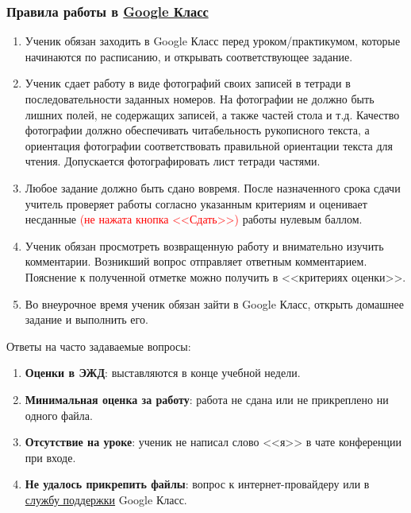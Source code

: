 \documentclass[algebra,a5paper]{pum}
\begin{document}
\subsubsection*{Правила работы в \href{https://classroom.google.com/}{Google Класс}}
\begin{enumerate}[nosep]
  \item Ученик обязан заходить в Google Класс перед уроком/практикумом, которые начинаются по расписанию, и открывать соответствующее задание.
  \item Ученик сдает работу в виде фотографий своих записей в тетради в последовательности заданных номеров. На фотографии не должно быть лишних полей, не содержащих записей, а также частей стола и т.д. Качество фотографии должно обеспечивать читабельность рукописного текста, а ориентация фотографии соответствовать правильной ориентации текста для чтения. Допускается фотографировать лист тетради частями.
  \item Любое задание должно быть сдано вовремя. После назначенного срока сдачи учитель проверяет работы согласно указанным критериям и оценивает несданные \textcolor{red}{(не нажата кнопка <<Сдать>>)} работы нулевым баллом.
  \item Ученик обязан просмотреть возвращенную работу и внимательно изучить комментарии. Возникший вопрос отправляет ответным комментарием. Пояснение к полученной отметке можно получить в <<критериях оценки>>.
  \item Во внеурочное время ученик обязан зайти в Google Класс, открыть домашнее задание и выполнить его.
\end{enumerate}

\begin{pumbox}{Ответы на часто задаваемые вопросы:}
  \begin{enumerate}[nosep]
    \item {\bf Оценки в ЭЖД}: выставляются в конце учебной недели. 
    \item {\bf Минимальная оценка за работу}: работа не сдана или не прикреплено ни одного файла.
    \item {\bf Отсутствие на уроке}: ученик не написал слово <<я>> в чате конференции при входе.
    \item {\bf Не удалось прикрепить файлы}: вопрос к интернет-провайдеру или в \href{https://support.google.com/edu/classroom/?hl=ru#topic=6020277}{службу поддержки} Google Класс.
  \end{enumerate}
\end{pumbox}

\end{document}
